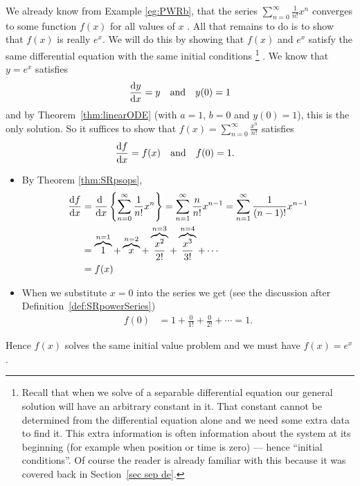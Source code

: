 \begin{eg}[Optional --- Another approach to showing that  $\sum_{n=0}^\infty
                         \frac{1}{n!}x^n$ is $e^x$.]\label{eg:expSeriesC}
We already know from Example \ref{eg:PWRb}, that the series $\sum_{n=0}^\infty \frac{1}{n!}x^n$ converges to some function $f(x)$
for all values of $x$ . All that remains to do is to show that $f(x)$
is really $e^x$. We will
do this by showing that $f(x)$ and $e^x$ satisfy the same differential
equation with the same initial conditions%
%
\footnote{Recall that when we solve of a separable differential equation
our general solution will have an arbitrary constant
in it. That constant cannot be determined from the differential
equation alone and we need some extra data to find it.
This extra information is often information about the system
at its beginning (for example when position or time is zero) ---
hence ``initial conditions''. Of course
the reader is already familiar with this because it
was covered back in Section~\ref{sec sep de}.}%
%
. We know that $y=e^x$ satisfies
\begin{align*}
  \diff{y}{x} &= y  &\text{and} && y(0)=1
\end{align*}
and by Theorem~\ref{thm:linearODE} (with $a=1$, $b=0$ and $y(0)=1$),
this is the only solution. So it suffices to show that
$f(x)= \sum_{n=0}^\infty \frac{x^n}{n!}$ satisfies
\begin{align*}
 \diff{f}{x}&=f(x) &\text{and} && f(0)&=1.
\end{align*}

\begin{itemize}
\item By Theorem \ref{thm:SRpsops},
\begin{align*}
 \diff{f}{x} &= \diff{}{x}\left\{\sum_{n=0}^\infty \frac{1}{n!}x^n\right\}
              = \sum_{n=1}^\infty \frac{n}{n!}x^{n-1}
              = \sum_{n=1}^\infty \frac{1}{(n-1)!}x^{n-1} \\
             &= \overbrace{1}^{n=1} + \overbrace{x}^{n=2}
                  + \overbrace{\frac{x^2}{2!}}^{n=3}
                  + \overbrace{\frac{x^3}{3!}}^{n=4}
                  + \cdots \\
             &= f(x)
\end{align*}
\item When we substitute $x=0$ into the series we get (see the discussion
after Definition~\ref{def:SRpowerSeries})
\begin{align*}
  f(0) &= 1 + \frac{0}{1!} + \frac{0}{2!} + \cdots = 1.
\end{align*}
\end{itemize}
Hence $f(x)$ solves the same initial value problem and we must have
$f(x)=e^x$.
\end{eg}



